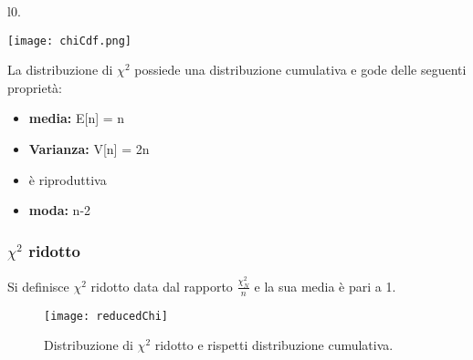 \documentclass[11pt,a4paper]{book}
\begin{document}
\begin{wrapfigure}[7]{l}{0.\textwidth}
\centering

\texttt{[image: chiCdf.png]}	

\end{wrapfigure}

\noindent La distribuzione di $\chi^2$ possiede una distribuzione cumulativa e gode delle seguenti propriet\`{a}:

\begin{itemize}
	\item \textbf{media:} E[n] = n
	\item \textbf{Varianza:} V[n] = 2n
	\item \`{e} riproduttiva
	\item \textbf{moda:} n-2
	\end{itemize}
	
\subsubsection{$\chi^2$ ridotto}

Si definisce $\chi^2$ ridotto data dal rapporto $\frac{\chi^2_N}{n}$ e la sua media \`{e} pari a 1.

 
\begin{figure}[ht]
\vspace{0.in}
\texttt{[image: reducedChi]}	
\centering
\vspace{0.in}
\caption{Distribuzione di $\chi^2$ ridotto e rispetti distribuzione cumulativa.}
\end{figure}
\end{document}
